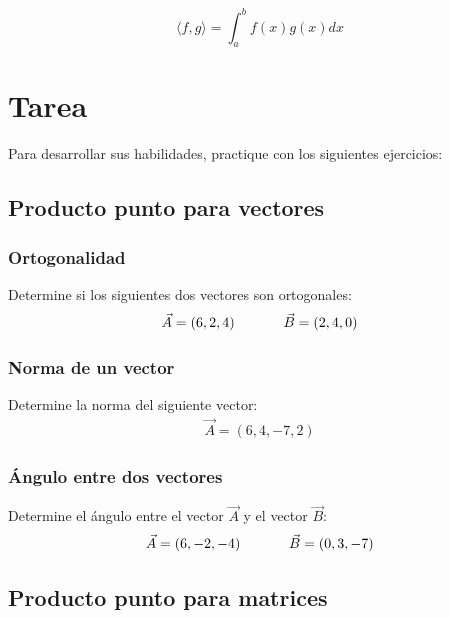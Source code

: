 \documentclass{article}
\begin{document}
    \begin{equation}
        \langle f, g\rangle=\int_{a}^{b} f(x) g(x) d x
    \end{equation}

\section{Tarea}

    Para desarrollar sus habilidades, practique con los siguientes ejercicios:

    \subsection{Producto punto para vectores}

        \subsubsection{Ortogonalidad}

            Determine si los siguientes dos vectores son ortogonales:
            \begin{gather*}
                \vec{A} = (6,2,4) \hspace*{35 pt} \vec{B}=(2,4,0)
            \end{gather*}

        \subsubsection{Norma de un vector}

            Determine la norma del siguiente vector:
            \begin{gather*}
                \vec{A} = (6,4,-7,2)
            \end{gather*}

        \subsubsection{Ángulo entre dos vectores}

            Determine el ángulo entre el vector $\vec{A}$ y el vector $\vec{B}$:
            \begin{gather*}
                \vec{A} = (6,-2,-4) \hspace*{35 pt} \vec{B} = (0, 3, -7)
            \end{gather*}

    \subsection{Producto punto para matrices}
\end{document}
